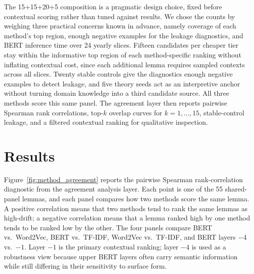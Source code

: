 \documentclass[12pt]{article}
\begin{document}
The 15+15+20+5 composition is a pragmatic design choice, fixed before contextual scoring rather than tuned against results. We chose the counts by weighing three practical concerns known in advance, namely coverage of each method's top region, enough negative examples for the leakage diagnostics, and BERT inference time over 24 yearly slices. Fifteen candidates per cheaper tier stay within the informative top region of each method-specific ranking without inflating contextual cost, since each additional lemma requires sampled contexts across all slices. Twenty stable controls give the diagnostics enough negative examples to detect leakage, and five theory seeds act as an interpretive anchor without turning domain knowledge into a third candidate source. All three methods score this same panel. The agreement layer then reports pairwise Spearman rank correlations, top-$k$ overlap curves for $k=1,\dots,15$, stable-control leakage, and a filtered contextual ranking for qualitative inspection.

\section{Results}
\label{sec:results}

Figure~\ref{fig:method_agreement} reports the pairwise Spearman rank-correlation diagnostic from the agreement analysis layer. Each point is one of the 55 shared-panel lemmas, and each panel compares how two methods score the same lemma. A positive correlation means that two methods tend to rank the same lemmas as high-drift; a negative correlation means that a lemma ranked high by one method tends to be ranked low by the other. The four panels compare BERT vs.\ Word2Vec, BERT vs.\ TF-IDF, Word2Vec vs.\ TF-IDF, and BERT layers $-4$ vs.\ $-1$. Layer $-1$ is the primary contextual ranking; layer $-4$ is used as a robustness view because upper BERT layers often carry semantic information while still differing in their sensitivity to surface form.
\end{document}

